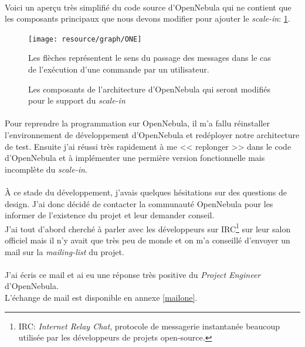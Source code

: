 \paragraph*{}
Voici un aperçu très simplifié du code source d'OpenNebula qui ne contient que les composants principaux que nous devons modifier pour ajouter le \emph{scale-in}: \ref{archionescalein}.

\begin{figure}[H]
\centering
\texttt{[image: resource/graph/ONE]}
\caption{Les composants de l'architecture d'OpenNebula qui seront modifiés pour le support du \emph{scale-in}\\}
Les flèches représentent le sens du passage des messages dans le cas de l'exécution d'une commande par un utilisateur.
\label{archionescalein}
\end{figure}


\paragraph*{}
Pour reprendre la programmation sur OpenNebula, il m'a fallu réinstaller l'environnement de développement d'OpenNebula et redéployer notre architecture de test.
Ensuite j'ai réussi très rapidement à me << replonger >> dans le code d'OpenNebula et à implémenter une permière version fonctionnelle mais incomplète du \emph{scale-in}.

\paragraph*{}
À ce stade du développement, j'avais quelques hésitations sur des questions de design. J'ai donc décidé de contacter la communauté OpenNebula pour les informer de l'existence
du projet et leur demander conseil.\\
J'ai tout d'abord cherché à parler avec les développeurs sur IRC\footnote{IRC: \emph{Internet Relay Chat}, protocole de messagerie instantanée beaucoup utilisée
par les développeurs de projets open-source.} sur leur salon officiel mais il n'y avait que très peu de monde et on m'a conseillé d'envoyer un mail sur la \emph{mailing-list} du
projet.

\paragraph*{}
J'ai écris ce mail et ai eu une réponse très positive du \emph{Project Engineer} d'OpenNebula.\\
L'échange de mail est disponible en annexe \ref{mailone}.


